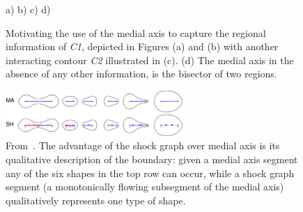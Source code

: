 \begin{figure}[ht]
\center
a)
b)
c)
d)
\caption{Motivating the use of the medial axis to capture the regional information of \emph{C1}, depicted in Figures (a) and (b) with another interacting contour \emph{C2} illustrated in (c). (d) The medial axis in the absence of any other information, is the bisector of two regions. } 
\label{fig:ma_motivate}
\end{figure}

\begin{figure}[ht]
\center
\includegraphics[width=0.6\textwidth]{figs/shocks-ma-new.pdf}
\caption{From~\cite{Giblin:Kimia:IJCV03}. The advantage of the shock graph over medial axis is its qualitative description of the boundary: given a medial axis segment any of the six shapes in the top row can occur, while a shock graph segment (a monotonically flowing subsegment of the medial axis) qualitatively represents one type of shape.}
\label{fig:ma_vs_sg}
\end{figure}

